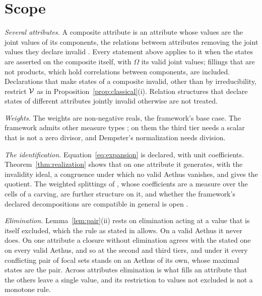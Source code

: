 \section{Scope}\label{sec:scope}

\emph{Several attributes.} A composite attribute is an attribute whose values are the joint values of its components, the relations between attributes removing the joint values they declare invalid \cite{Aethus}. Every statement above applies to it when the states are asserted on the composite itself, with $\Omega$ its valid joint values; fillings that are not products, which hold correlations between components, are included. Declarations that make states of a composite invalid, other than by irreducibility, restrict $\mathcal{V}$ as in Proposition~\ref{prop:classical}(i). Relation structures that declare states of different attributes jointly invalid otherwise are not treated.

\emph{Weights.} The weights are non-negative reals, the framework's base case. The framework admits other measure types \cite{AethusTree}; on them the third tier needs a scalar that is not a zero divisor, and Dempster's normalization needs division.

\emph{The identification.} Equation~\eqref{eq:expansion} is declared, with unit coefficients. Theorem~\ref{thm:realization} shows that on one attribute it generates, with the invalidity ideal, a congruence under which no valid Aethus vanishes, and gives the quotient. The weighted splittings of \cite{AethusTree}, whose coefficients are a measure over the cells of a carving, are further structure on it, and whether the framework's declared decompositions are compatible in general is open \cite{Aethus, AethusTree}.

\emph{Elimination.} Lemma~\ref{lem:pair}(ii) rests on elimination acting at a value that is itself excluded, which the rule as stated in \cite{Aethus} allows. On a valid Aethus it never does. On one attribute a closure without elimination agrees with the stated one on every valid Aethus, and so at the second and third tiers, and under it every conflicting pair of focal sets stands on an Aethus of its own, whose maximal states are the pair. Across attributes elimination is what fills an attribute that the others leave a single value, and its restriction to values not excluded is not a monotone rule.

